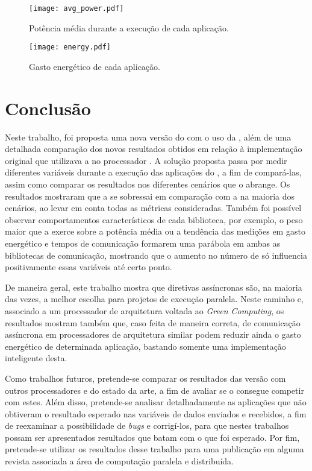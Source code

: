 \begin{figure}[h]
  \centering
  \caption{Potência média durante a execução de cada aplicação.}
  \label{fig:avgpower}
  \texttt{[image: avg\_power.pdf]}
\end{figure}

\clearpage

\begin{figure}[h]
  \centering
  \caption{Gasto energético de cada aplicação.}
  \label{fig:energy}
  \texttt{[image: energy.pdf]}
\end{figure}

\chapter{Conclusão}
\label{ch:conclusao}

Neste trabalho, foi proposta uma nova versão do \capb com o uso da \API \ASYNC, além de uma detalhada comparação dos novos resultados obtidos em relação à implementação original que utilizava a \API \IPC no processador \mppa. A solução proposta passa por medir diferentes variáveis durante a execução das aplicações do \capb, a fim de compará-las, assim como comparar os resultados nos diferentes cenários que o \capb abrange.  Os resultados mostraram que a \API \ASYNC se sobressai em comparação com a \IPC na maioria dos cenários, ao levar em conta todas as métricas consideradas. Também foi possível observar comportamentos característicos de cada biblioteca, por exemplo, o peso maior que a \ASYNC exerce sobre a potência média ou a tendência das medições em gasto energético e tempos de comunicação formarem uma parábola em ambas as bibliotecas de comunicação, mostrando que o aumento no número de \clusters só influencia positivamente essas variáveis até certo ponto.

De maneira geral, este trabalho mostra que diretivas assíncronas são, na maioria das vezes, a melhor escolha para projetos de execução paralela. Neste caminho e, associado a um processador de arquitetura voltada ao \textit{Green Computing}, os resultados mostram também que, caso feita de maneira correta, \APIs de comunicação assíncrona em processadores de arquitetura similar podem reduzir ainda o gasto energético de determinada aplicação, bastando somente uma implementação inteligente desta.

Como trabalhos futuros, pretende-se comparar os resultados das versão \ASYNC com outros processadores \manycore e \multicore do estado da arte, a fim de avaliar se o \mppa consegue competir com estes. Além disso, pretende-se analisar detalhadamente as aplicações \capb que não obtiveram o resultado esperado nas variáveis de dados enviados e recebidos, a fim de reexaminar a possibilidade de \textit{bugs} e corrigí-los, para que nestes trabalhos possam ser apresentados resultados que batam com o que foi esperado. Por fim, pretende-se utilizar os resultados desse trabalho para uma publicação em alguma revista associada a área de computação paralela e distribuída.


